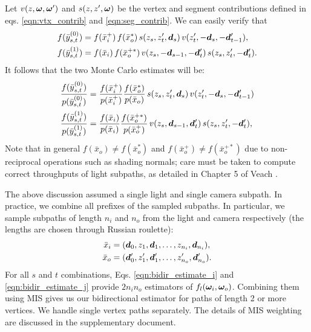 Let $v(z, \bm{\omega}, \bm{\omega}')$ and $s(z, z', \bm{\omega})$ be the vertex and segment contributions defined in eqs. \eqref{eqn:vtx_contrib} and \eqref{eqn:seg_contrib}.
We can easily verify that
\begin{align}
f(\bar{y}_{s,t}^{(0)}) &= f(\bar{x}_i^+) \, f(\bar{x}_o^*) \, s(z_s, z'_t, \bm{d}_s) \, v(z'_t, -\bm{d}_s, -\bm{d}'_{t - 1}),\\
f(\bar{y}_{s,t}^{(1)}) &= f(\bar{x}_i) \, f(\bar{x}_o^{+*}) \, v(z_s, -\bm{d}_{s - 1}, -\bm{d}'_t) \, s(z_s, z'_t, -\bm{d}'_t).
\end{align}
It follows that the two Monte Carlo estimates will be:
\begin{align}
\label{eqn:bidir_estimate_i}
\frac{f(\bar{y}^{(0)}_{s, t})}{p(\bar{y}^{(0)}_{s, t})} &=
\frac{f(\bar{x}_i^+)}{p(\bar{x}_i^+)}
\frac{f(\bar{x}_o^*)}{p(\bar{x}_o)}
\, s(z_s, z'_t, \bd_s) \, v(z'_t, -\bd_s, -\bd'_{t - 1})\\
%
\label{eqn:bidir_estimate_j}
\frac{f(\bar{y}^{(1)}_{s, t})}{p(\bar{y}^{(1)}_{s, t})} &=
\frac{f(\bar{x}_i)}{p(\bar{x}_i)}
\frac{f(\bar{x}_o^{+*})}{p(\bar{x}_o^+)}
\, v(z_s, \bd_{s - 1}, \bd'_t) \, s(z_s, z'_t, -\bd'_t),
\end{align}
Note that in general $f(\bar x_o) \neq f(\bar x_o^*)$ and $f(\bar x_o^+) \neq f(\bar x_o^{+*})$ due to non-reciprocal operations such as shading normals; care must be taken to compute correct throughputs of light subpaths, as detailed in Chapter 5 of Veach \cite{veach1997robust}.

The above discussion assumed a single light and single camera subpath. In practice, we combine all prefixes of the sampled subpaths. In particular, we sample subpaths of length $n_i$ and $n_o$ from the light and camera respectively (the lengths are chosen through Russian roulette):
\begin{equation}
\begin{aligned}
\bar{x}_i &= (\bm{d}_0, z_1, \bm{d}_1, \ldots, z_{n_i}, \bm{d}_{n_i}),\\
\bar{x}_o &= (\bm{d}'_0, z'_1, \bm{d}'_1, \ldots, z'_{n_o}, \bm{d}'_{n_o}).
\end{aligned}
\end{equation}
For all $s$ and $t$ combinations, Eqs. \eqref{eqn:bidir_estimate_i} and \eqref{eqn:bidir_estimate_j} provide $2 n_i n_o$ estimators of $f_l(\bm{\omega}_i, \bm{\omega}_o)$.
Combining them using MIS gives us our bidirectional estimator for paths of length 2 or more vertices. We handle single vertex paths separately. The details of MIS weighting are discussed in the supplementary document.


